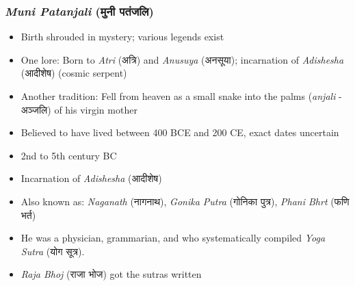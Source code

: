 \begin{frame}[fragile]\frametitle{\textit{Muni Patanjali} (मुनी पतंजलि)}

    \begin{itemize}
        \item Birth shrouded in mystery; various legends exist
        \item One lore: Born to \textit{Atri} (अत्रि) and \textit{Anusuya} (अनसूया); incarnation of \textit{Adishesha} (आदीशेष) (cosmic serpent)
        \item Another tradition: Fell from heaven as a small snake into the palms (\textit{anjali} - अञ्जलि) of his virgin mother
        \item Believed to have lived between 400 BCE and 200 CE, exact dates uncertain
        \item 2nd to 5th century BC
        \item Incarnation of \textit{Adishesha} (आदीशेष)
        \item Also known as: \textit{Naganath} (नागनाथ), \textit{Gonika Putra} (गोनिका पुत्र), \textit{Phani Bhrt} (फणि भर्त)
        \item He was a physician, grammarian, and who systematically compiled \textit{Yoga Sutra} (योग सूत्र).
        \item \textit{Raja Bhoj} (राजा भोज) got the sutras written
    \end{itemize}

\end{frame}


